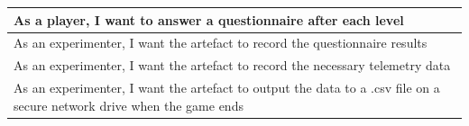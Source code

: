 \documentclass[journal]{IEEEtran}
\begin{document}
\begin{table}[t]
\begin{tabular}{|l|}
As a player, I want to answer a questionnaire after each level                                                         \\ \hline
As an experimenter, I want the artefact to record the questionnaire results                                            \\ \hline
As an experimenter, I want the artefact to record the necessary telemetry data                                         \\ \hline
As an experimenter, I want the artefact to output the data to a .csv file on a secure network drive when the game ends \\ \hline
\end{tabular}
\end{table}
\end{document}
